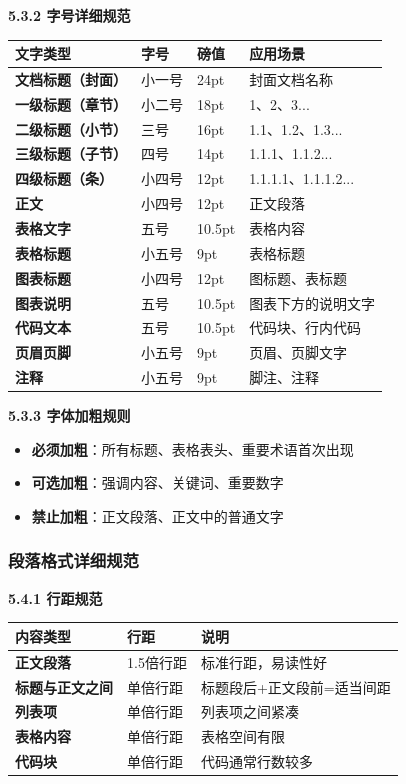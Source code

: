 \documentclass[12pt,a4paper]{article}
\numberwithin{equation}{section}  %
\begin{document}
\textbf{5.3.2 字号详细规范}

\begin{longtable}{|p{3cm}|p{4cm}|p{4cm}|p{3cm}|}
\hline
文字类型 & 字号 & 磅值 & 应用场景 \\
\hline
\textbf{文档标题（封面）} & 小一号 & 24pt & 封面文档名称 \\
\textbf{一级标题（章节）} & 小二号 & 18pt & 1、2、3... \\
\textbf{二级标题（小节）} & 三号 & 16pt & 1.1、1.2、1.3... \\
\textbf{三级标题（子节）} & 四号 & 14pt & 1.1.1、1.1.2... \\
\textbf{四级标题（条）} & 小四号 & 12pt & 1.1.1.1、1.1.1.2... \\
\textbf{正文} & 小四号 & 12pt & 正文段落 \\
\textbf{表格文字} & 五号 & 10.5pt & 表格内容 \\
\textbf{表格标题} & 小五号 & 9pt & 表格标题 \\
\textbf{图表标题} & 小四号 & 12pt & 图标题、表标题 \\
\textbf{图表说明} & 五号 & 10.5pt & 图表下方的说明文字 \\
\textbf{代码文本} & 五号 & 10.5pt & 代码块、行内代码 \\
\textbf{页眉页脚} & 小五号 & 9pt & 页眉、页脚文字 \\
\textbf{注释} & 小五号 & 9pt & 脚注、注释 \\
\hline
\end{longtable}

\textbf{5.3.3 字体加粗规则}

\begin{itemize}
\item \textbf{必须加粗}：所有标题、表格表头、重要术语首次出现
\item \textbf{可选加粗}：强调内容、关键词、重要数字
\item \textbf{禁止加粗}：正文段落、正文中的普通文字
\end{itemize}

\subsubsection{段落格式详细规范}
\textbf{5.4.1 行距规范}

\begin{longtable}{|p{4cm}|p{5cm}|p{5cm}|}
\hline
内容类型 & 行距 & 说明 \\
\hline
\textbf{正文段落} & 1.5倍行距 & 标准行距，易读性好 \\
\textbf{标题与正文之间} & 单倍行距 & 标题段后+正文段前=适当间距 \\
\textbf{列表项} & 单倍行距 & 列表项之间紧凑 \\
\textbf{表格内容} & 单倍行距 & 表格空间有限 \\
\textbf{代码块} & 单倍行距 & 代码通常行数较多 \\
\hline
\end{longtable}
\end{document}
